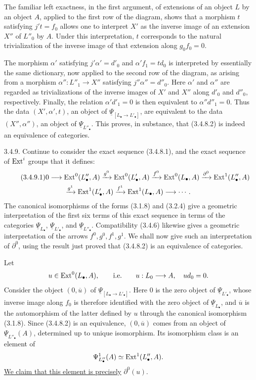 The familiar left exactness, in the first argument, of extensions
of an object $L$ by an object $A$, applied to the first row of the
diagram, shows that a morphism $t$ satisfying $j't=f_0$ allows one
to interpret $X'$ as the inverse image of an extension $X''$ of
$L''_0$ by $A$.  Under this interpretation, $t$ corresponds to the
natural trivialization of the inverse image of that extension along
$g_0f_0=0$.

The morphism $\alpha'$ satisfying $j'\alpha'=d'_0$ and
$\alpha'f_1=td_0$ is interpreted by essentially the same dictionary,
now applied to the second row of the diagram, as arising from a
morphism $\alpha'':L''_1\longrightarrow X''$ satisfying
$j''\alpha''=d''_0$.  Here $\alpha'$ and $\alpha''$ are regarded as
trivializations of the inverse images of $X'$ and $X''$ along
$d'_0$ and $d''_0$, respectively.  Finally, the relation
$\alpha'd'_1=0$ is then equivalent to $\alpha''d''_1=0$.  Thus the
data $(X',\alpha',t)$, an object of
$\underline\Psi_{[L_\bullet\longrightarrow L'_\bullet]}$, are
equivalent to the data $(X'',\alpha'')$, an object of
$\underline\Psi_{L''_\bullet}$.  This proves, in substance, that
(3.4.8.2) is indeed an equivalence of categories.

3.4.9. Continue to consider the exact sequence (3.4.8.1), and the
exact sequence of $\operatorname{Ext}^i$ groups that it defines:
\begin{multline}\tag{3.4.9.1}
 0\longrightarrow\operatorname{Ext}^0(L''_\bullet,A)
 \xrightarrow{g^0}\operatorname{Ext}^0(L'_\bullet,A)
 \xrightarrow{f^0}\operatorname{Ext}^0(L_\bullet,A)
 \xrightarrow{\partial^0}\operatorname{Ext}^1(L''_\bullet,A)\\
 \xrightarrow{g^1}\operatorname{Ext}^1(L'_\bullet,A)
 \xrightarrow{f^1}\operatorname{Ext}^1(L_\bullet,A)\longrightarrow\cdots.
\end{multline}
The canonical isomorphisms of the forms (3.1.8) and (3.2.4) give a
geometric interpretation of the first six terms of this exact
sequence in terms of the categories $\underline\Psi_{L_\bullet}$,
$\underline\Psi_{L'_\bullet}$, and
$\underline\Psi_{L''_\bullet}$.  Compatibility (3.4.6) likewise
gives a geometric interpretation of the arrows
$f^0,g^0,f^1,g^1$.  We shall now give such an interpretation of
$\partial^0$, using the result just proved that (3.4.8.2) is an
equivalence of categories.

Let
\[
 u\in\operatorname{Ext}^0(L_\bullet,A),
 \qquad\text{i.e.}\qquad
 u:L_0\longrightarrow A,\quad ud_0=0.
\]
Consider the object $(0,\overline u)$ of
$\underline\Psi_{[L_\bullet\to L'_\bullet]}$.  Here $0$ is the
zero object of $\underline\Psi_{L'_\bullet}$, whose inverse image
along $f_0$ is therefore identified with the zero object of
$\underline\Psi_{L_\bullet}$, and $\overline u$ is the automorphism
of the latter defined by $u$ through the canonical isomorphism
(3.1.8).  Since (3.4.8.2) is an equivalence, $(0,\overline u)$ comes
from an object of $\underline\Psi_{L''_\bullet}(A)$, determined up
to unique isomorphism.  Its isomorphism class is an element of
\[
 \Psi^1_{L''_\bullet}(A)\simeq\operatorname{Ext}^1(L''_\bullet,A).
\]
\underline{We claim that this element is precisely}
$\partial^0(u)$.

